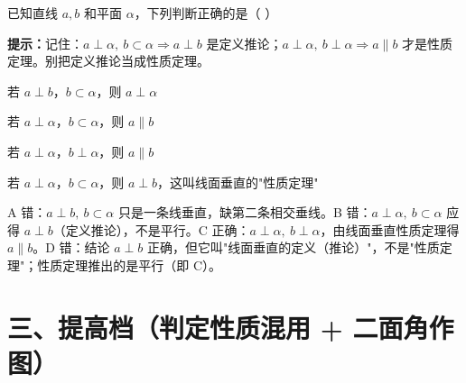 \documentclass{exam-zh}
\begin{document}
\begin{question}[points=5]
  \noindent
  \begin{minipage}[t]{\dimexpr\linewidth-60mm-6mm\relax}
    \vspace{0pt}
    已知直线 $a,b$ 和平面 $\alpha$，下列判断正确的是（    ）
    \begin{hintbox}
\textbf{提示：}记住：$a\perp\alpha,\ b\subset\alpha\Rightarrow a\perp b$ 是定义推论；$a\perp\alpha,\ b\perp\alpha\Rightarrow a\parallel b$ 才是性质定理。别把定义推论当成性质定理。\end{hintbox}

    \par
    \begin{choices}[columns=1]
      \item 若 $a\perp b$，$b\subset\alpha$，则 $a\perp\alpha$
      \item 若 $a\perp\alpha$，$b\subset\alpha$，则 $a\parallel b$
      \item 若 $a\perp\alpha$，$b\perp\alpha$，则 $a\parallel b$
      \item 若 $a\perp\alpha$，$b\subset\alpha$，则 $a\perp b$，这叫线面垂直的"性质定理"
    \end{choices}
  \end{minipage}\hfill
  \begin{diagramcoltikz}{60mm}{区分线面垂直的"定义推论"与"性质定理"。}
  }
  \end{diagramcoltikz}
  \paren[C]
  \begin{solutionblock}
    A 错：$a\perp b,\ b\subset\alpha$ 只是一条线垂直，缺第二条相交垂线。B 错：$a\perp\alpha,\ b\subset\alpha$ 应得 $a\perp b$（定义推论），不是平行。C 正确：$a\perp\alpha,\ b\perp\alpha$，由线面垂直性质定理得 $a\parallel b$。D 错：结论 $a\perp b$ 正确，但它叫"线面垂直的定义（推论）"，不是"性质定理"；性质定理推出的是平行（即 C）。
  \end{solutionblock}
\end{question}



\section*{三、提高档（判定性质混用 + 二面角作图）}

\end{document}
